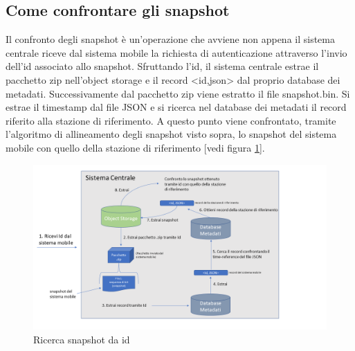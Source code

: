 \subsection{Come confrontare gli snapshot}
Il confronto degli snapshot è un'operazione che avviene non appena il sistema centrale riceve dal sistema mobile la richiesta di autenticazione attraverso l'invio dell'id associato allo snapshot. Sfruttando l'id, il sistema centrale estrae il pacchetto zip nell'object storage e il record <id,json> dal proprio database dei metadati. Successivamente dal pacchetto zip viene estratto il file snapshot.bin. Si estrae il timestamp dal file JSON e si ricerca nel database dei metadati il record riferito alla stazione di riferimento. A questo punto viene confrontato, tramite l'algoritmo di allineamento degli snapshot visto sopra, lo snapshot del sistema mobile con quello della stazione di riferimento [vedi figura \ref{fig: ricercasnapshot }].
\begin{figure}[!h]
\centering
\includegraphics[scale=0.5]{images/Foto5.png}
\caption{Ricerca snapshot da id}
\label{fig: ricercasnapshot }
\end{figure}